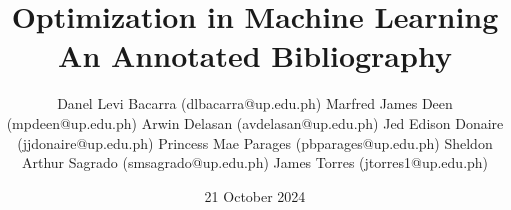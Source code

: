 \documentclass[11pt]{article}
\title{Optimization in Machine Learning\\\medskip An Annotated Bibliography}
\author{
	Danel Levi Bacarra (dlbacarra@up.edu.ph)
	Marfred James Deen (mpdeen@up.edu.ph)
	Arwin Delasan (avdelasan@up.edu.ph)
	Jed Edison Donaire (jjdonaire@up.edu.ph)
	Princess Mae Parages (pbparages@up.edu.ph)
	Sheldon Arthur Sagrado (smsagrado@up.edu.ph)
	James Torres (jtorres1@up.edu.ph)
}
\date{21 October 2024}
\begin{document}
\maketitle
\nocite{*} %


\end{document}
